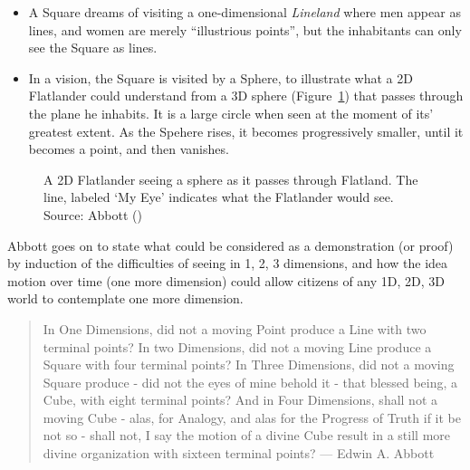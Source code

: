 \documentclass[
  letterpaper,
  10pt,
  krantz2]{krantz}
\begin{document}
\begin{itemize}
\item
  A Square dreams of visiting a one-dimensional \emph{Lineland} where
  men appear as lines, and women are merely ``illustrious points'', but
  the inhabitants can only see the Square as lines.
\item
  In a vision, the Square is visited by a Sphere, to illustrate what a
  2D Flatlander could understand from a 3D sphere
  (Figure~\ref{fig-flatland-spheres}) that passes through the plane he
  inhabits. It is a large circle when seen at the moment of its'
  greatest extent. As the Spehere rises, it becomes progressively
  smaller, until it becomes a point, and then vanishes.
\end{itemize}

\begin{figure}


\caption{\label{fig-flatland-spheres}A 2D Flatlander seeing a sphere as
it passes through Flatland. The line, labeled `My Eye' indicates what
the Flatlander would see. Source: Abbott
()}

\end{figure}%

Abbott goes on to state what could be considered as a demonstration (or
proof) by induction of the difficulties of seeing in 1, 2, 3 dimensions,
and how the idea motion over time (one more dimension) could allow
citizens of any 1D, 2D, 3D world to contemplate one more dimension.

\begin{quote}
In One Dimensions, did not a moving Point produce a Line with two
terminal points? In two Dimensions, did not a moving Line produce a
Square with four terminal points? In Three Dimensions, did not a moving
Square produce - did not the eyes of mine behold it - that blessed
being, a Cube, with eight terminal points? And in Four Dimensions, shall
not a moving Cube - alas, for Analogy, and alas for the Progress of
Truth if it be not so - shall not, I say the motion of a divine Cube
result in a still more divine organization with sixteen terminal points?
--- Edwin A. Abbott
\end{quote}
\end{document}
